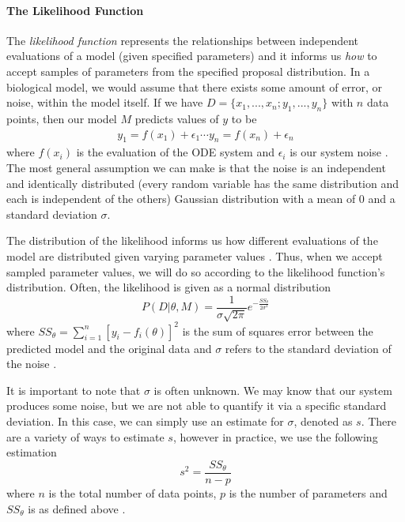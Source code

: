 \paragraph{The Likelihood Function} \label{The_Likelihood_Function} The \emph{likelihood function} represents the relationships between independent evaluations of a model (given specified parameters) and it informs us \emph{how} to accept samples of parameters from the specified proposal distribution. In a biological model, we would assume that there exists some amount of error, or noise, within the model itself. If we have $D = \{x_1,...,x_n; y_1,...,y_n\}$ with $n$ data points, then our model $M$ predicts values of $y$ to be
\begin{align} \label{eq:5mcmc}
y_1 = f(x_1) + \epsilon_1 \cdots y_n = f(x_n) + \epsilon_n
\end{align}
where $f(x_i)$ is the evaluation of the ODE system and $\epsilon_i$ is our system noise \cite{astrostats}. The most general assumption we can make is that the noise is an independent and identically distributed (every random variable has the same distribution and each is independent of the others) Gaussian distribution with a mean of 0 and a standard deviation $\sigma$. 
\par The distribution of the likelihood informs us how different evaluations of the model are distributed given varying parameter values \cite{smithCh8}. Thus, when we accept sampled parameter values, we will do so according to the likelihood function's distribution. Often, the likelihood is given as a normal distribution
\begin{equation} \label{eq:6mcmc}
    P(D|\theta, M) = \frac{1}{\sigma \sqrt{2\pi}} e^{-\frac{SS_{\theta}}{{2\sigma^2}}}
\end{equation}
where $SS_{\theta} = \sum_{i=1}^{n}[y_i - f_i(\theta)]^2$ is the sum of squares error between the predicted model and the original data and $\sigma$ refers to the standard deviation of the noise \cite{smithCh8} \cite{astrostats}.
\par It is important to note that $\sigma$ is often unknown. We may know that our system produces some noise, but we are not able to quantify it via a specific standard deviation. In this case, we can simply use an estimate for $\sigma$, denoted as $s$. There are a variety of ways to estimate $s$, however in practice, we use the following estimation
\begin{equation} \label{eq:7mcmc}
s^2 = \frac{SS_{\theta}}{n-p}
\end{equation}
where $n$ is the total number of data points, $p$ is the number of parameters and $SS_{\theta}$ is as defined above \cite{smithCh8}.
